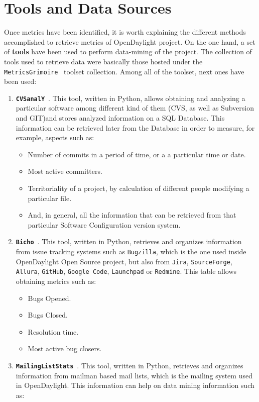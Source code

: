 \documentclass[a4paper, 12pt]{book}
\begin{document}
\section{Tools and Data Sources}
\label{sec:odl_tools_and_data_sources}
Once metrics have been identified, it is worth explaining the different methods accomplished to retrieve metrics of OpenDaylight project. On the one hand, a set of \textbf{tools} have been used to perform data-mining of the project. The collection of tools used to retrieve data were basically those hosted under the \texttt{MetricsGrimoire}~\cite{MetricsGrimoire} toolset collection. Among all of the toolset, next ones have been used:
\begin{enumerate}\itemsep0pt
\item{\textbf{\texttt{CVSanalY}}~\cite{CVSAnalY}}. This tool, written in Python, allows obtaining and analyzing a particular software among different kind of them (CVS, as well as Subversion and GIT)and stores analyzed information on a SQL Database. This information can be retrieved later from the Database in order to measure, for example, aspects such as:
\begin{itemize}
\item{Number of commits in a period of time, or a a particular time or date}.
\item{Most active committers}.
\item{Territoriality of a project, by calculation of different people modifying a particular file}.
\item{And, in general, all the information that can be retrieved from that particular Software Configuration version system}.
\end{itemize}
\item{\textbf{\texttt{Bicho}}~\cite{Bicho}}. This tool, written in Python, retrieves and organizes information from issue tracking systems such as \texttt{Bugzilla}, which is the one used inside OpenDaylight Open Source project, but also from \texttt{Jira}, \texttt{SourceForge}, \texttt{Allura}, \texttt{GitHub}, \texttt{Google Code}, \texttt{Launchpad} or \texttt{Redmine}. This table allows obtaining metrics such as:
\begin{itemize}\itemsep0pt
\item{Bugs Opened}.
\item{Bugs Closed}.
\item{Resolution time}.
\item{Most active bug closers}.
\end{itemize}
\item{\textbf{\texttt{MailingListStats}}~\cite{MailStats}}. This tool, written in Python, retrieves and organizes information from mailman based mail lists, which is the mailing system used in OpenDaylight. This information can help on data mining information such as:

\end{enumerate}
\end{document}

